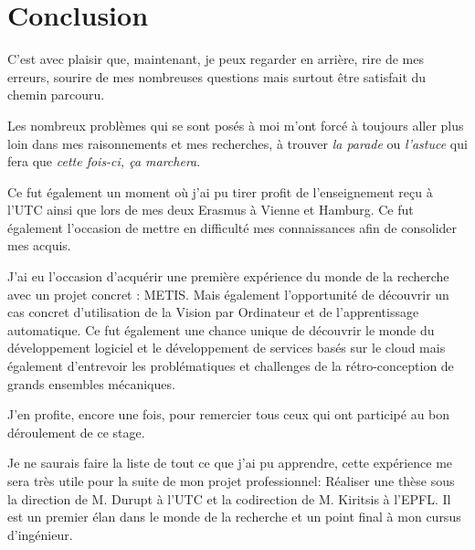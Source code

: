 \chapter{Conclusion}

C'est avec plaisir que, maintenant, je peux regarder en arrière, rire de mes erreurs, sourire de mes nombreuses questions mais surtout être satisfait du chemin parcouru.

Les nombreux problèmes qui se sont posés à moi m'ont forcé à toujours aller plus loin dans mes raisonnements et mes recherches, à trouver \textit{la parade} ou \textit{l'astuce} qui fera que \textit{cette fois-ci, ça marchera}.

Ce fut également un moment où j'ai pu tirer profit de l'enseignement reçu à l'UTC ainsi que lors de mes deux Erasmus à Vienne et Hamburg. Ce fut également l'occasion de mettre en difficulté mes connaissances afin de consolider mes acquis.

J'ai eu l'occasion d'acquérir une première expérience du monde de la recherche avec un projet concret : METIS. Mais également l'opportunité de découvrir un cas concret d'utilisation de la Vision par Ordinateur et de l'apprentissage automatique. Ce fut également une chance unique de découvrir le monde du développement logiciel et le développement de services basés sur le cloud mais également d'entrevoir les problématiques et challenges de la rétro-conception de grands ensembles mécaniques.

J'en profite, encore une fois, pour remercier tous ceux qui ont participé au bon déroulement de ce stage. 

Je ne saurais faire la liste de tout ce que j'ai pu apprendre, cette expérience me sera très utile pour la suite de mon projet professionnel: Réaliser une thèse sous la direction de M. Durupt à l'UTC et la codirection de M. Kiritsis à l'EPFL. Il est un premier élan dans le monde de la recherche et un point final à mon cursus d'ingénieur.
